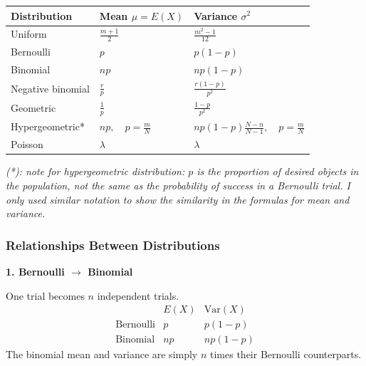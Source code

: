 ﻿\documentclass[12pt]{article}
\begin{document}
\begin{table}[H]
\centering
\begin{tabularx}{\textwidth}{
    >{\raggedright\arraybackslash}X
    >{\centering\arraybackslash}X
    >{\centering\arraybackslash}X
}
\toprule
\textbf{Distribution}
& \textbf{Mean $\mu=E(X)$}
& \textbf{Variance $\sigma^2$} \\
\midrule

Uniform
& $\displaystyle \frac{m+1}{2}$
& $\displaystyle \frac{m^2-1}{12}$ \\

Bernoulli
& $p$
& $p(1-p)$ \\

Binomial
& $np$
& $np(1-p)$ \\

Negative binomial
& $\displaystyle \frac{r}{p}$
& $\displaystyle \frac{r(1-p)}{p^2}$ \\

Geometric
& $\displaystyle \frac{1}{p}$
& $\displaystyle \frac{1-p}{p^2}$ \\

Hypergeometric*
& $\displaystyle np,\quad p = \frac{m}{N}$
& $\displaystyle np\left(1-p\right)\frac{N-n}{N-1},\quad p = \frac{m}{N}$ \\

Poisson
& $\lambda$
& $\lambda$ \\

\bottomrule
\end{tabularx}
\end{table}

\renewcommand{\arraystretch}{1}

\textit{(*): note for hypergeometric distribution: \(p\) is the proportion of desired objects in the population, not the same as the probability of success in a Bernoulli trial. I only used similar notation to show the similarity in the formulas for mean and variance.}
\subsubsection*{Relationships Between Distributions}

\textbf{1. Bernoulli $\rightarrow$ Binomial}

One trial becomes $n$ independent trials.
\[
\begin{array}{r|cc}
& E(X) & \mathrm{Var}(X) \\ \hline
\text{Bernoulli} & p & p(1-p) \\
\text{Binomial} & np & np(1-p)
\end{array}
\]
The binomial mean and variance are simply $n$ times their
Bernoulli counterparts.
\end{document}
